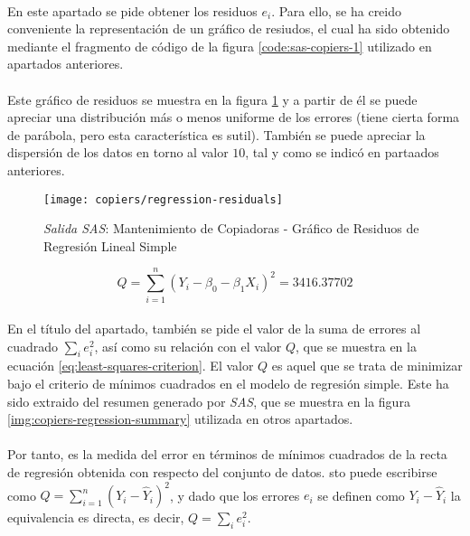 \documentclass{article}
\begin{document}
        \paragraph{}
        En este apartado se pide obtener los residuos $e_i$. Para ello, se ha creido conveniente la representación de un gráfico de resiudos, el cual ha sido obtenido mediante el fragmento de código de la figura \ref{code:sas-copiers-1} utilizado en apartados anteriores.

        \paragraph{}
        Este gráfico de residuos se muestra en la figura \ref{img:copiers-regression-residuals} y a partir de él se puede apreciar una distribución más o menos uniforme de los errores (tiene cierta forma de parábola, pero esta característica es sutil). También se puede apreciar la dispersión de los datos en torno al valor $10$, tal y como se indicó en partaados anteriores.

        \begin{figure}[!h]
          \centering
          \texttt{[image: copiers/regression-residuals]}
          \caption{\emph{Salida SAS}: Mantenimiento de Copiadoras - Gráfico de Residuos de Regresión Lineal Simple}
          \label{img:copiers-regression-residuals}
        \end{figure}

        \begin{equation}
        \label{eq:least-squares-criterion}
          Q = \sum\limits_{i=1}^n(Y_i - \beta_0 - \beta_1X_i)^2 = 3416.37702
        \end{equation}

        \paragraph{}
        En el título del apartado, también se pide el valor de la suma de errores al cuadrado $\sum_i e_i^2$, así como su relación con el valor $Q$, que se muestra en la ecuación \eqref{eq:least-squares-criterion}. El valor $Q$ es aquel que se trata de minimizar bajo el criterio de mínimos cuadrados en el modelo de regresión simple. Este ha sido extraido del resumen generado por \emph{SAS}, que se muestra en la figura \ref{img:copiers-regression-summary} utilizada en otros apartados.

        \paragraph{}
        Por tanto, es la medida del error en términos de mínimos cuadrados de la recta de regresión obtenida con respecto del conjunto de datos. sto puede escribirse como $Q = \sum_{i=1}^n(Y_i - \widehat{Y}_i)^2$, y dado que los errores $e_i$ se definen como $Y_i - \widehat{Y}_i$ la equivalencia es directa, es decir, $Q = \sum_i e_i^2$.
\end{document}
